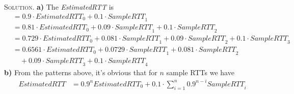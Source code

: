\documentclass[12pt, a4paper, oneside]{article}
\newenvironment{solution}{\par\noindent\textsc{Solution. }}{\\\par}
\begin{document}
\begin{solution}
    \textbf{a)} The \textit{EstimatedRTT} is
    \begin{align*}
        &= 0.9\cdot\textit{EstimatedRTT}_0 + 0.1\cdot\textit{SampleRTT}_1 \\
        &= 0.81\cdot\textit{EstimatedRTT}_0 + 0.09\cdot\textit{SampleRTT}_1 + 0.1\cdot\textit{SampleRTT}_2 \\
        &= 0.729\cdot\textit{EstimatedRTT}_0 + 0.081\cdot\textit{SampleRTT}_1 + 0.09\cdot\textit{SampleRTT}_2 + 0.1\cdot\textit{SampleRTT}_3 \\
        &= 0.6561\cdot\textit{EstimatedRTT}_0 + 0.0729\cdot\textit{SampleRTT}_1 + 0.081\cdot\textit{SampleRTT}_2 \\ &\quad + 0.09\cdot\textit{SampleRTT}_3  + 0.1\cdot\textit{SampleRTT}_4
    \end{align*}
    \textbf{b)} From the patterns above, it's obvious that for $n$ sample RTTs we have
    \begin{align*}
        \textit{EstimatedRTT} &= 0.9^n \textit{EstimatedRTT}_0 + 0.1\cdot\sum_{i=1}^n 0.9^{n-i}\textit{SampleRTT}_i
    \end{align*}
\end{solution}
\end{document}
